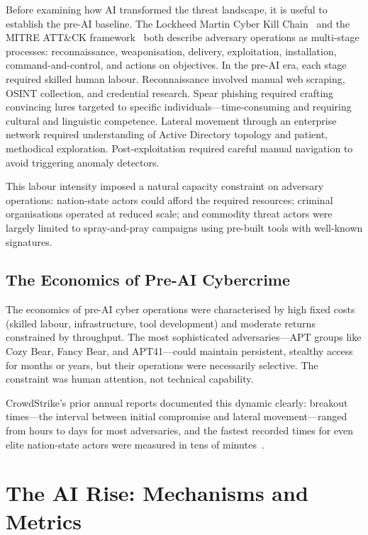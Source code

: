 \documentclass[journal]{IEEEtran}
\begin{document}
Before examining how AI transformed the threat landscape, it is useful to establish
the pre-AI baseline. The Lockheed Martin Cyber Kill Chain~\cite{hutchins2011} and
the MITRE ATT\&CK framework~\cite{mitreattack} both describe adversary operations as
multi-stage processes: reconnaissance, weaponisation, delivery, exploitation,
installation, command-and-control, and actions on objectives. In the pre-AI era,
each stage required skilled human labour. Reconnaissance involved manual web
scraping, OSINT collection, and credential research. Spear phishing required
crafting convincing lures targeted to specific individuals---time-consuming and
requiring cultural and linguistic competence. Lateral movement through an enterprise
network required understanding of Active Directory topology and patient,
methodical exploration. Post-exploitation required careful manual navigation to
avoid triggering anomaly detectors.

This labour intensity imposed a natural capacity constraint on adversary operations:
nation-state actors could afford the required resources; criminal organisations
operated at reduced scale; and commodity threat actors were largely limited to
spray-and-pray campaigns using pre-built tools with well-known signatures.

\subsection{The Economics of Pre-AI Cybercrime}

The economics of pre-AI cyber operations were characterised by high fixed costs
(skilled labour, infrastructure, tool development) and moderate returns constrained
by throughput. The most sophisticated adversaries---APT groups like Cozy Bear,
Fancy Bear, and APT41---could maintain persistent, stealthy access for months or
years, but their operations were necessarily selective. The constraint was human
attention, not technical capability.

CrowdStrike's prior annual reports documented this dynamic clearly: breakout
times---the interval between initial compromise and lateral movement---ranged from
hours to days for most adversaries, and the fastest recorded times for even
elite nation-state actors were measured in tens of minutes~\cite{cs2025gtr}.

\section{The AI Rise: Mechanisms and Metrics}
\label{sec:ai_rise}
\end{document}
